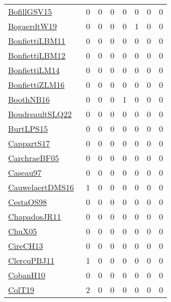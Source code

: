 {\begin{longtable}{l*{7}{r}}
\href{papers/BofillGSV15.pdf}{BofillGSV15}~\cite{BofillGSV15} & 0 & 0 & 0 & 0 & 0 & 0 & 0\\
\href{papers/BogaerdtW19.pdf}{BogaerdtW19}~\cite{BogaerdtW19} & 0 & 0 & 0 & 0 & 1 & 0 & 0\\
\href{papers/BonfiettiLBM11.pdf}{BonfiettiLBM11}~\cite{BonfiettiLBM11} & 0 & 0 & 0 & 0 & 0 & 0 & 0\\
\href{papers/BonfiettiLBM12.pdf}{BonfiettiLBM12}~\cite{BonfiettiLBM12} & 0 & 0 & 0 & 0 & 0 & 0 & 0\\
\href{papers/BonfiettiLM14.pdf}{BonfiettiLM14}~\cite{BonfiettiLM14} & 0 & 0 & 0 & 0 & 0 & 0 & 0\\
\href{papers/BonfiettiZLM16.pdf}{BonfiettiZLM16}~\cite{BonfiettiZLM16} & 0 & 0 & 0 & 0 & 0 & 0 & 0\\
\href{papers/BoothNB16.pdf}{BoothNB16}~\cite{BoothNB16} & 0 & 0 & 0 & 1 & 0 & 0 & 0\\
\href{papers/BoudreaultSLQ22.pdf}{BoudreaultSLQ22}~\cite{BoudreaultSLQ22} & 0 & 0 & 0 & 0 & 0 & 0 & 0\\
\href{papers/BurtLPS15.pdf}{BurtLPS15}~\cite{BurtLPS15} & 0 & 0 & 0 & 0 & 0 & 0 & 0\\
\href{papers/CappartS17.pdf}{CappartS17}~\cite{CappartS17} & 0 & 0 & 0 & 0 & 0 & 0 & 0\\
\href{papers/CarchraeBF05.pdf}{CarchraeBF05}~\cite{CarchraeBF05} & 0 & 0 & 0 & 0 & 0 & 0 & 0\\
\href{papers/Caseau97.pdf}{Caseau97}~\cite{Caseau97} & 0 & 0 & 0 & 0 & 0 & 0 & 0\\
\href{papers/CauwelaertDMS16.pdf}{CauwelaertDMS16}~\cite{CauwelaertDMS16} & 1 & 0 & 0 & 0 & 0 & 0 & 0\\
\href{papers/CestaOS98.pdf}{CestaOS98}~\cite{CestaOS98} & 0 & 0 & 0 & 0 & 0 & 0 & 0\\
\href{papers/ChapadosJR11.pdf}{ChapadosJR11}~\cite{ChapadosJR11} & 0 & 0 & 0 & 0 & 0 & 0 & 0\\
\href{papers/ChuX05.pdf}{ChuX05}~\cite{ChuX05} & 0 & 0 & 0 & 0 & 0 & 0 & 0\\
\href{papers/CireCH13.pdf}{CireCH13}~\cite{CireCH13} & 0 & 0 & 0 & 0 & 0 & 0 & 0\\
\href{papers/ClercqPBJ11.pdf}{ClercqPBJ11}~\cite{ClercqPBJ11} & 1 & 0 & 0 & 0 & 0 & 0 & 0\\
\href{papers/CobanH10.pdf}{CobanH10}~\cite{CobanH10} & 0 & 0 & 0 & 0 & 0 & 0 & 0\\
\href{papers/ColT19.pdf}{ColT19}~\cite{ColT19} & 2 & 0 & 0 & 0 & 0 & 0 & 0\\

\end{longtable}}
